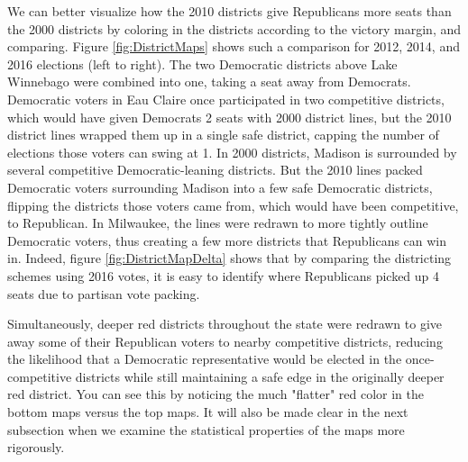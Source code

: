 \documentclass[preprint,12pt]{article}
\begin{document}
We can better visualize how the 2010 districts give Republicans more seats than the 2000 districts by coloring in the districts according to the victory margin, and comparing.
Figure \ref{fig:DistrictMaps} shows such a comparison for 2012, 2014, and 2016 elections (left to right).
The two Democratic districts above Lake Winnebago were combined into one, taking a seat away from Democrats.
Democratic voters in Eau Claire once participated in two competitive districts, which would have given Democrats 2 seats with 2000 district lines, but the 2010 district lines wrapped them up in a single safe district, capping the number of elections those voters can swing at 1.
In 2000 districts, Madison is surrounded by several competitive Democratic-leaning districts.
But the 2010 lines packed Democratic voters surrounding Madison into a few safe Democratic districts, flipping the districts those voters came from, which would have been competitive, to Republican.
In Milwaukee, the lines were redrawn to more tightly outline Democratic voters, thus creating a few more districts that Republicans can win in.
Indeed, figure \ref{fig:DistrictMapDelta} shows that by comparing the districting schemes using 2016 votes, it is easy to identify where Republicans picked up 4 seats due to partisan vote packing.

Simultaneously, deeper red districts throughout the state were redrawn to give away some of their Republican voters to nearby competitive districts, reducing the likelihood that a Democratic representative would be elected in the once-competitive districts while still maintaining a safe edge in the originally deeper red district.  
You can see this by noticing the much "flatter" red color in the bottom maps versus the top maps.
It will also be made clear in the next subsection when we examine the statistical properties of the maps more rigorously.
\end{document}
